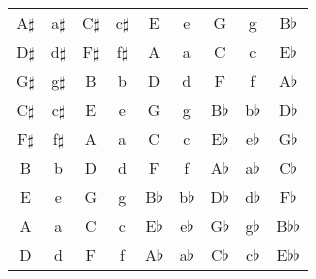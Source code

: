 \begin{tabular}{ccccccccc}
  \toprule
  A$\sharp$ & a$\sharp$ & C$\sharp$ & c$\sharp$ & E  & e  & G  & g  & B$\flat$\\
  D$\sharp$ & d$\sharp$ & F$\sharp$ & f$\sharp$ & A  & a  & C  & c  & E$\flat$\\
  G$\sharp$ & g$\sharp$ & B  & b  & D  & d  & F  & f  & A$\flat$\\
  C$\sharp$ & c$\sharp$ & E  & e  & G  & g  & B$\flat$ & b$\flat$ & D$\flat$\\
  F$\sharp$ & f$\sharp$ & A  & a  & C  & c  & E$\flat$ & e$\flat$ & G$\flat$\\
  B  & b  & D  & d  & F  & f  & A$\flat$ & a$\flat$ & C$\flat$\\
  E  & e  & G  & g  & B$\flat$ & b$\flat$ & D$\flat$ & d$\flat$ & F$\flat$\\
  A  & a  & C  & c  & E$\flat$ & e$\flat$ & G$\flat$ & g$\flat$ & B$\flat$$\flat$\\
  D  & d  & F  & f  & A$\flat$ & a$\flat$ & C$\flat$ & c$\flat$ & E$\flat$$\flat$\\
\bottomrule
\end{tabular}
